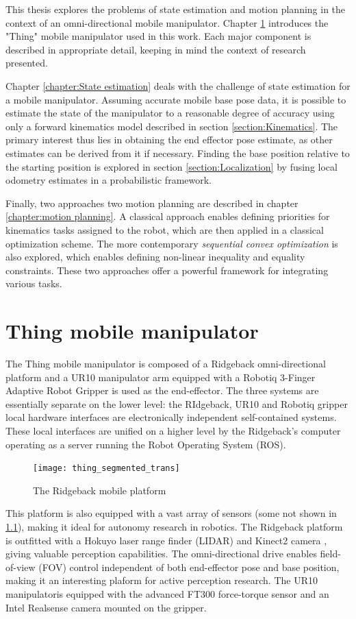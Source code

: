 \documentclass[times, utf8, diplomski, english]{fer}
\begin{document}
This thesis explores the problems of state estimation and motion planning in the context of an omni-directional mobile manipulator.
Chapter \ref{chapter:thing} introduces the "Thing" mobile manipulator used in this work.
Each major component is described in appropriate detail, keeping in mind the context of research presented.

Chapter \ref{chapter:State estimation} deals with the challenge of state estimation for a mobile manipulator.
Assuming accurate mobile base pose data, it is possible to estimate the state of the manipulator to a reasonable degree of accuracy using only a forward kinematics model described in section \ref{section:Kinematics}.
The primary interest thus lies in obtaining the end effector pose estimate, as other estimates can be derived from it if necessary.
Finding the base position relative to the starting position is explored in section \ref{section:Localization} by fusing local odometry estimates in a probabilistic framework.

Finally, two approaches two motion planning are described in chapter \ref{chapter:motion planning}.
A classical approach enables defining priorities for kinematics tasks assigned to the robot, which are then applied in a classical optimization scheme.
The more contemporary \textit{sequential convex optimization} is also explored, which enables defining non-linear inequality and equality constraints. 
These two approaches offer a powerful framework for integrating various tasks.

\chapter{Thing mobile manipulator}\label{chapter:thing}
The Thing mobile manipulator is composed of a Ridgeback omni-directional platform and a UR10 manipulator arm equipped with a Robotiq 3-Finger Adaptive Robot Gripper is used as the end-effector.
The three systems are essentially separate on the lower level: the RIdgeback, UR10 and Robotiq gripper local hardware interfaces are electronically independent self-contained systems.
These local interfaces are unified on a higher level by the Ridgeback's computer operating as a server running the Robot Operating System (ROS).
\begin{figure}[h]
\label{figure:thing}
\centering
\texttt{[image: thing\_segmented\_trans]}
\caption{The Ridgeback mobile platform}
\end{figure}
This platform is also equipped with a vast array of sensors (some not shown in \ref{figure:thing}), making it ideal for autonomy research in robotics. 
The Ridgeback platform is outfitted with a Hokuyo laser range finder (LIDAR) and Kinect2 camera , giving valuable perception capabilities.
The omni-directional drive enables field-of-view (FOV) control independent of both end-effector pose and base position, making it an interesting plaform for active perception research.
The UR10 manipulatoris equipped with the advanced FT300 force-torque sensor and an Intel Realsense camera mounted on the gripper.
\end{document}
